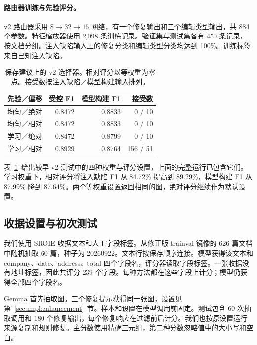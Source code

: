 \paragraph{路由器训练与先验评分。}

v2 路由器采用 $8\!\rightarrow\!32\!\rightarrow\!16$ 网络，有一个修复输出和三个编辑类型输出，共 884 个参数。特征缩放器使用 2,098 条训练记录。验证集与测试集各有 450 条记录，按文档分组。注入缺陷输入上的修复分类和编辑类型分类均达到 100\%。训练标签来自已知注入缺陷。

\begin{table}[t]
\centering
\caption{保存建议上的 v2 选择器。相对评分以等权重为零点。接受数按注入缺陷／模型构建输入排列。}
\label{tab:math_revision_selector}
\small
\begin{tabular}{lrrr}
\toprule
先验／偏移 & 受控 F1 & 模型构建 F1 & 接受数 \\
\midrule
均匀／绝对 & 0.8472 & 0.8833 & 0 / 10 \\
均匀／相对 & 0.8472 & 0.8833 & 0 / 10 \\
学习／绝对 & 0.8472 & 0.8799 & 0 / 10 \\
学习／相对 & 0.8929 & 0.8764 & 156 / 51 \\
\bottomrule
\end{tabular}
\end{table}

表~\ref{tab:math_revision_selector}~给出较早 v2 测试中的四种权重与评分设置，上面的完整运行已包含它们。学习权重下，相对评分将注入缺陷 F1 从 84.72\% 提高到 89.29\%，模型构建 F1 从 87.99\% 降到 87.64\%。两个等权重设置返回相同的图，绝对评分继续作为默认设置。

\subsection{收据设置与初次测试}
\label{sec:eval:external_receipts}

我们使用 SROIE 收据文本和人工字段标签\citep{ref_sroie2019}。从修正版 trainval 镜像的 626 篇文档中随机抽取 60 篇，种子为 20260922。文本行按保存顺序连接。模型获得该文本和 company、date、address、total 四个字段名，评分器读取字段标签。一张收据没有地址标签，因此共评分 239 个字段。每种方法都在这些字段上计分；模型仍获得全部四个字段名。

Gemma 首先抽取图。三个修复提示获得同一张图，设置见第~\ref{sec:impl:enhancement}~节。样本和设置在模型调用前固定。测试包含 60 次抽取调用和 180 个修复输出，每个修复响应在过滤前后计分。我们也按原设置运行来源复制和规则修复。主分数使用精确三元组，第二种分数忽略值中的大小写和空白。

